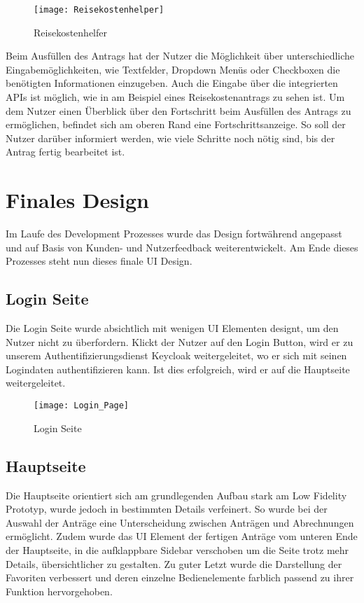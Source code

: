 \begin{figure}[h]
\centering
\texttt{[image: Reisekostenhelper]}
\caption{Reisekostenhelfer}\label{Reisekostenhelfer}
\end{figure}

Beim Ausfüllen des Antrags hat der Nutzer die Möglichkeit über unterschiedliche Eingabemöglichkeiten,
wie Textfelder, Dropdown Menüs oder Checkboxen die benötigten Informationen einzugeben. Auch die Eingabe
über die integrierten \ac{API}s ist möglich, wie in  am Beispiel eines Reisekostenantrags zu sehen ist.
Um dem Nutzer einen Überblick über den Fortschritt beim Ausfüllen des Antrags zu ermöglichen, befindet sich am oberen
Rand eine Fortschrittsanzeige.
So soll der Nutzer darüber informiert werden, wie viele Schritte noch
nötig sind, bis der Antrag fertig bearbeitet ist.

\section{Finales Design}\label{Finales Design}
Im Laufe des Development Prozesses wurde das Design fortwährend angepasst und auf Basis
von Kunden- und Nutzerfeedback weiterentwickelt. Am Ende dieses Prozesses steht nun
dieses finale \ac{UI} Design.

\subsection{Login Seite}\label{Login Seite}
Die Login Seite wurde absichtlich mit wenigen \ac{UI} Elementen designt, um den Nutzer
nicht zu überfordern. Klickt der Nutzer auf den Login Button, wird er zu unserem
Authentifizierungsdienst Keycloak weitergeleitet, wo er sich mit seinen Logindaten
authentifizieren kann. Ist dies erfolgreich, wird er auf die Hauptseite weitergeleitet.

\begin{figure}[h]
\centering
\texttt{[image: Login\_Page]}
\caption{Login Seite}\label{Login Page}
\end{figure}

\subsection{Hauptseite}\label{Haupt Seite}
Die Hauptseite orientiert sich am grundlegenden Aufbau stark am Low Fidelity Prototyp,
wurde jedoch in bestimmten Details verfeinert. So wurde bei der Auswahl der Anträge eine
Unterscheidung zwischen Anträgen und Abrechnungen ermöglicht. Zudem wurde das \ac{UI}
Element der fertigen Anträge vom unteren Ende der Hauptseite, in die aufklappbare Sidebar
verschoben um die Seite trotz mehr Details, übersichtlicher zu gestalten. Zu guter Letzt
wurde die Darstellung der Favoriten verbessert und deren einzelne Bedienelemente farblich
passend zu ihrer Funktion hervorgehoben.

